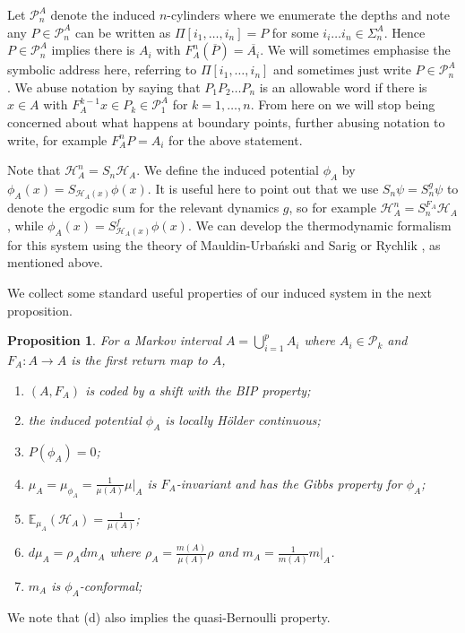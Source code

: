 \documentclass[11pt, reqno]{amsart}
\numberwithin{equation}{section}
\theoremstyle{plain}%
\newtheorem{prop}[thm]{Proposition}
\theoremstyle{definition}
\def\P{\ensuremath{\mathcal P}}
\def\E{\mathbb E}
\renewcommand{\H}{\mathcal{H}}
\theoremstyle{nonumberplain}
\begin{document}
Let $\P_n^A$ denote the induced $n$-cylinders where we enumerate the depths and note any $P\in \P_n^A$ can be written as $\Pi[i_1, \ldots, i_n] = P$ for some $i_i\ldots i_n\in \Sigma_n^A$.  Hence $P\in \P_n^A$ implies there is $A_i$ with $F_A^n(\overline{P})=\overline{A_i}$.   We will sometimes emphasise the symbolic address here, referring to $\Pi[i_1, \ldots, i_n]$ and sometimes just write $P\in \P_n^A$.  We abuse notation by saying that $P_1P_2\ldots P_n$ is an allowable word if there is $x\in A$ with $F_A^{k-1}x\in P_k\in \P_1^A$ for $k=1, \ldots, n$.  From here on we will stop being concerned about what happens at boundary points,  further abusing notation to write, for example $F_A^nP=A_i$ for the above statement.  

Note that $\H_A^n=S_n \H_A$.
We define the induced potential $\phi_A$ by $\phi_A(x)= S_{\H_A(x)}\phi(x)$. 
It is useful here to point out that we use $S_n\psi= S_n^g\psi$ to denote the ergodic sum for the relevant dynamics $g$, so for example $\H_A^n=S_n^{F_A} \H_A$, while $\phi_A(x)= S_{\H_A(x)}^f\phi(x)$.
 We can develop the thermodynamic formalism for this system using the theory of Mauldin-Urba\'nski and Sarig or Rychlik \cite{Ryc83}, as mentioned above. 

We collect some standard useful properties of our induced system in the next proposition.

\begin{prop}
For a Markov interval $A =\bigcup_{i=1}^p A_i$ where $A_i\in\P_k$ and  $F_A:A \to A$ is the first return map to $A$,
\begin{enumerate}
\item[(a)] $(A, F_A)$ is coded by a shift with the BIP property;
\item[(b)] the induced potential $\phi_A$ is locally H\"older continuous;
\item[(c)] $P(\phi_A)=0$;
\item[(d)]  $\mu_A=\mu_{\phi_A}= \frac{1}{\mu(A)}\mu |_A$ is $F_A$-invariant and has the Gibbs property for $\phi_A$;
\item[(e)] $\E_{\mu_A}(\H_A)=\frac{1}{\mu(A)}$;
\item[(f)] $d\mu_A=\rho_A dm_A$ where $\rho_A=\frac{m(A)}{\mu(A)} \rho$ and $m_A=\frac{1}{m(A)} m|_A$. 
\item[(g)] $m_A$ is $\phi_A$-conformal;
\end{enumerate}
\label{prop:indprops}
\end{prop}

We note that (d) also implies the quasi-Bernoulli property.
\end{document}
